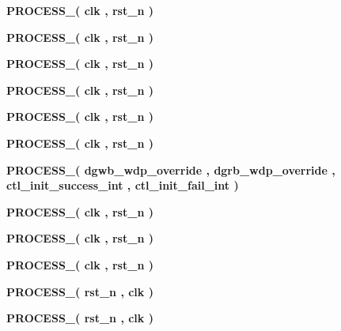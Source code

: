 \begin{DoxyCompactItemize}
\item 
{\bf P\+R\+O\+C\+E\+S\+S\+\_}{\bfseries  ( {\bfseries {\bfseries {\bf clk}} \textcolor{vhdlchar}{ }} , {\bfseries {\bfseries {\bf rst\+\_\+n}} \textcolor{vhdlchar}{ }} )}
\item 
{\bf P\+R\+O\+C\+E\+S\+S\+\_}{\bfseries  ( {\bfseries {\bfseries {\bf clk}} \textcolor{vhdlchar}{ }} , {\bfseries {\bfseries {\bf rst\+\_\+n}} \textcolor{vhdlchar}{ }} )}
\item 
{\bf P\+R\+O\+C\+E\+S\+S\+\_}{\bfseries  ( {\bfseries {\bfseries {\bf clk}} \textcolor{vhdlchar}{ }} , {\bfseries {\bfseries {\bf rst\+\_\+n}} \textcolor{vhdlchar}{ }} )}
\item 
{\bf P\+R\+O\+C\+E\+S\+S\+\_}{\bfseries  ( {\bfseries {\bfseries {\bf clk}} \textcolor{vhdlchar}{ }} , {\bfseries {\bfseries {\bf rst\+\_\+n}} \textcolor{vhdlchar}{ }} )}
\item 
{\bf P\+R\+O\+C\+E\+S\+S\+\_}{\bfseries  ( {\bfseries {\bfseries {\bf clk}} \textcolor{vhdlchar}{ }} , {\bfseries {\bfseries {\bf rst\+\_\+n}} \textcolor{vhdlchar}{ }} )}
\item 
{\bf P\+R\+O\+C\+E\+S\+S\+\_}{\bfseries  ( {\bfseries {\bfseries {\bf clk}} \textcolor{vhdlchar}{ }} , {\bfseries {\bfseries {\bf rst\+\_\+n}} \textcolor{vhdlchar}{ }} )}
\item 
{\bf P\+R\+O\+C\+E\+S\+S\+\_}{\bfseries  ( {\bfseries {\bfseries {\bf dgwb\+\_\+wdp\+\_\+override}} \textcolor{vhdlchar}{ }} , {\bfseries {\bfseries {\bf dgrb\+\_\+wdp\+\_\+override}} \textcolor{vhdlchar}{ }} , {\bfseries {\bfseries {\bf ctl\+\_\+init\+\_\+success\+\_\+int}} \textcolor{vhdlchar}{ }} , {\bfseries {\bfseries {\bf ctl\+\_\+init\+\_\+fail\+\_\+int}} \textcolor{vhdlchar}{ }} )}
\item 
{\bf P\+R\+O\+C\+E\+S\+S\+\_}{\bfseries  ( {\bfseries {\bfseries {\bf clk}} \textcolor{vhdlchar}{ }} , {\bfseries {\bfseries {\bf rst\+\_\+n}} \textcolor{vhdlchar}{ }} )}
\item 
{\bf P\+R\+O\+C\+E\+S\+S\+\_}{\bfseries  ( {\bfseries {\bfseries {\bf clk}} \textcolor{vhdlchar}{ }} , {\bfseries {\bfseries {\bf rst\+\_\+n}} \textcolor{vhdlchar}{ }} )}
\item 
{\bf P\+R\+O\+C\+E\+S\+S\+\_}{\bfseries  ( {\bfseries {\bfseries {\bf clk}} \textcolor{vhdlchar}{ }} , {\bfseries {\bfseries {\bf rst\+\_\+n}} \textcolor{vhdlchar}{ }} )}
\item 
{\bf P\+R\+O\+C\+E\+S\+S\+\_}{\bfseries  ( {\bfseries {\bfseries {\bf rst\+\_\+n}} \textcolor{vhdlchar}{ }} , {\bfseries {\bfseries {\bf clk}} \textcolor{vhdlchar}{ }} )}
\item 
{\bf P\+R\+O\+C\+E\+S\+S\+\_}{\bfseries  ( {\bfseries {\bfseries {\bf rst\+\_\+n}} \textcolor{vhdlchar}{ }} , {\bfseries {\bfseries {\bf clk}} \textcolor{vhdlchar}{ }} )}
\end{DoxyCompactItemize}
